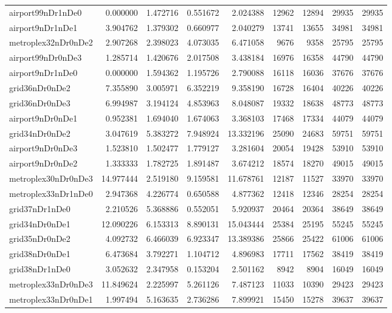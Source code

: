 \begin{longtable}{|l|r|r|r|r|r|r|r|r|}
airport99nDr1nDe0 & 0.000000 & 1.472716 & 0.551672 & 2.024388 & 12962 & 12894 & 29935 & 29935 \\
airport9nDr1nDe1 & 3.904762 & 1.379302 & 0.660977 & 2.040279 & 13741 & 13655 & 34981 & 34981 \\
metroplex32nDr0nDe2 & 2.907268 & 2.398023 & 4.073035 & 6.471058 & 9676 & 9358 & 25795 & 25795 \\
airport99nDr0nDe3 & 1.285714 & 1.420676 & 2.017508 & 3.438184 & 16976 & 16358 & 44790 & 44790 \\
airport9nDr1nDe0 & 0.000000 & 1.594362 & 1.195726 & 2.790088 & 16118 & 16036 & 37676 & 37676 \\
grid36nDr0nDe2 & 7.355890 & 3.005971 & 6.352219 & 9.358190 & 16728 & 16404 & 40226 & 40226 \\
grid36nDr0nDe3 & 6.994987 & 3.194124 & 4.853963 & 8.048087 & 19332 & 18638 & 48773 & 48773 \\
airport9nDr0nDe1 & 0.952381 & 1.694040 & 1.674063 & 3.368103 & 17468 & 17334 & 44079 & 44079 \\
grid34nDr0nDe2 & 3.047619 & 5.383272 & 7.948924 & 13.332196 & 25090 & 24683 & 59751 & 59751 \\
airport9nDr0nDe3 & 1.523810 & 1.502477 & 1.779127 & 3.281604 & 20054 & 19428 & 53910 & 53910 \\
airport9nDr0nDe2 & 1.333333 & 1.782725 & 1.891487 & 3.674212 & 18574 & 18270 & 49015 & 49015 \\
metroplex30nDr0nDe3 & 14.977444 & 2.519180 & 9.159581 & 11.678761 & 12187 & 11527 & 33970 & 33970 \\
metroplex33nDr1nDe0 & 2.947368 & 4.226774 & 0.650588 & 4.877362 & 12418 & 12346 & 28254 & 28254 \\
grid37nDr1nDe0 & 2.210526 & 5.368886 & 0.552051 & 5.920937 & 20464 & 20364 & 38649 & 38649 \\
grid34nDr0nDe1 & 12.090226 & 6.153313 & 8.890131 & 15.043444 & 25384 & 25195 & 55245 & 55245 \\
grid35nDr0nDe2 & 4.092732 & 6.466039 & 6.923347 & 13.389386 & 25866 & 25422 & 61006 & 61006 \\
grid38nDr0nDe1 & 6.473684 & 3.792271 & 1.104712 & 4.896983 & 17711 & 17562 & 38419 & 38419 \\
grid38nDr1nDe0 & 3.052632 & 2.347958 & 0.153204 & 2.501162 & 8942 & 8904 & 16049 & 16049 \\
metroplex33nDr0nDe3 & 11.849624 & 2.225997 & 5.261126 & 7.487123 & 11033 & 10390 & 29423 & 29423 \\
metroplex33nDr0nDe1 & 1.997494 & 5.163635 & 2.736286 & 7.899921 & 15450 & 15278 & 39637 & 39637 \\

\end{longtable}
